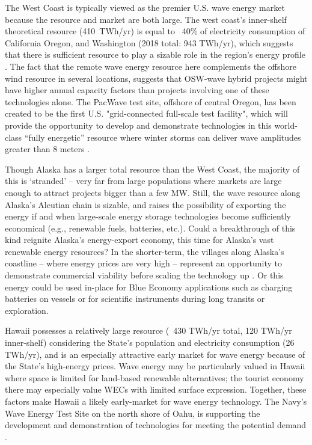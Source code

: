 The West Coast is typically viewed as the premier U.S. wave energy market because the resource and market are both large. The west coast's inner-shelf theoretical resource (410~TWh/yr) is equal to ~40\% of electricity consumption of California Oregon, and Washington (2018 total: 943 TWh/yr), which suggests that there is sufficient resource to play a sizable role in the region's energy profile \citep{energyinformationadministrationStateEnergyConsumption2020}.  
The fact that the remote wave energy resource here complements the offshore wind resource in several locations, suggests that OSW-wave hybrid projects might have higher annual capacity factors than projects involving one of these technologies alone. The PacWave test site, offshore of central Oregon, has been created to be the first U.S. "grid-connected full-scale test facility", which will provide the opportunity to develop and demonstrate technologies in this world-class ``fully energetic'' resource where winter storms can deliver wave amplitudes greater than 8 meters \citep[e.g.][]{allan_climate_2006}.

Though Alaska has a larger total resource than the West Coast, the majority of this is `stranded' -- very far from large populations where markets are large enough to attract projects bigger than a few MW. Still, the wave resource along Alaska's Aleutian chain is sizable, and raises the possibility of exporting the energy if and when large-scale energy storage technologies become sufficiently economical (e.g., renewable fuels, batteries, etc.). Could a breakthrough of this kind reignite Alaska's energy-export economy, this time for Alaska's vast renewable energy resources? In the shorter-term, the villages along Alaska's coastline -- where energy prices are very high -- represent an opportunity to demonstrate commercial viability before scaling the technology up \cite{alaskaenergyauthority2019PowerCost2020}. Or this energy could be used in-place for Blue Economy applications such as charging batteries on vessels or for scientific instruments during long transits or exploration. 

Hawaii possesses a relatively large resource (~430 TWh/yr total, 120 TWh/yr inner-shelf) considering the State's population and electricity consumption (26 TWh/yr), and is an especially attractive early market for wave energy because of the State's high-energy prices. 
Wave energy may be particularly valued in Hawaii where space is limited for land-based renewable alternatives; the tourist economy there may especially value WECs with limited surface expression. Together, these factors make Hawaii a likely early-market for wave energy technology. The Navy's Wave Energy Test Site on the north shore of Oahu, is supporting the development and demonstration of technologies for meeting the potential demand \citep{crossEarlyResearchEfforts2015}.

